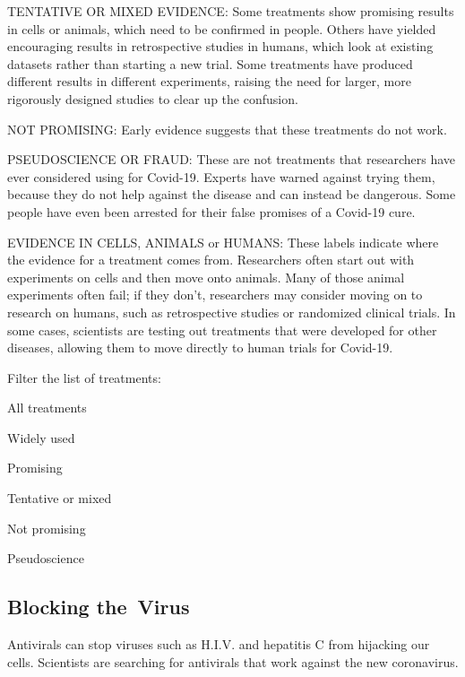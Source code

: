 TENTATIVE OR MIXED EVIDENCE: Some treatments show promising results in
cells or animals, which need to be confirmed in people. Others have
yielded encouraging results in retrospective studies in humans, which
look at existing datasets rather than starting a new trial. Some
treatments have produced different results in different experiments,
raising the need for larger, more rigorously designed studies to clear
up the confusion.

NOT PROMISING: Early evidence suggests that these treatments do not
work.

PSEUDOSCIENCE OR FRAUD: These are not treatments that researchers have
ever considered using for Covid-19. Experts have warned against trying
them, because they do not help against the disease and can instead be
dangerous. Some people have even been arrested for their false promises
of a Covid-19 cure.

EVIDENCE IN CELLS, ANIMALS or HUMANS: These labels indicate where the
evidence for a treatment comes from. Researchers often start out with
experiments on cells and then move onto animals. Many of those animal
experiments often fail; if they don't, researchers may consider moving
on to research on humans, such as retrospective studies or randomized
clinical trials. In some cases, scientists are testing out treatments
that were developed for other diseases, allowing them to move directly
to human trials for Covid-19.

Filter the list of treatments:

All treatments

Widely used

Promising

Tentative or mixed

Not promising

Pseudoscience

\hypertarget{blocking-the-virus}{%
\subsection{Blocking the~Virus}\label{blocking-the-virus}}

Antivirals can stop viruses such as H.I.V. and hepatitis C from
hijacking our cells. Scientists are searching for antivirals that work
against the new coronavirus.

